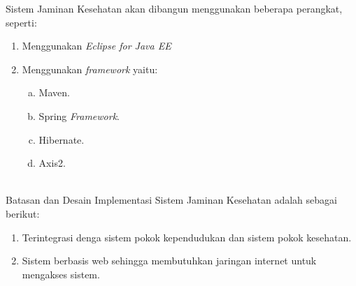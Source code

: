 Sistem Jaminan Kesehatan akan dibangun menggunakan beberapa perangkat, seperti:
\begin{enumerate}[1.]
	\item Menggunakan \textit{Eclipse for Java EE}
	\item Menggunakan \textit{framework} yaitu:
	\begin{enumerate}[a.]
		\item Maven. 
		\item Spring \textit{Framework}.
		\item Hibernate.
		\item Axis2.
	\end{enumerate}
\end{enumerate}
\par
\\
Batasan dan Desain Implementasi Sistem Jaminan Kesehatan adalah sebagai berikut:
\begin{enumerate}
	\item Terintegrasi denga sistem pokok kependudukan dan sistem pokok kesehatan.
	\item Sistem berbasis web sehingga membutuhkan jaringan internet untuk mengakses sistem.
\end{enumerate}